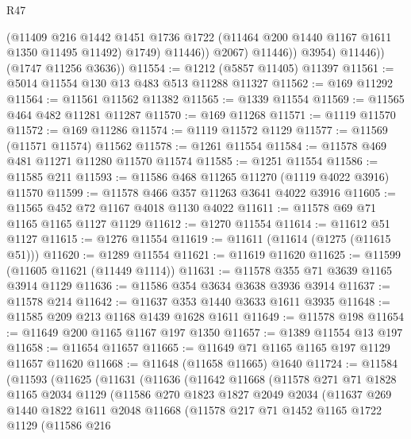 \begin{lexlean}{R47}
\begin{coremodule}
                      (@11409
                        @216
                        @1442
                        @1451
                        @1736
                        @1722
                        (@11464 @200 @1440 @1167 @1611 @1350 @11495 @11492)
                        @1749)
                      @11446))
                  @2067)
                @11446))
            @3954)
          @11446))
      (@1747 @11256 @3636))
@11554 := @1212 (@5857 @11405) @11397
@11561 := @5014 @11554 @130 @13 @483 @513 @11288 @11327
@11562 := @169 @11292
@11564 := @11561 @11562 @11382
@11565 := @1339 @11554
@11569 := @11565 @464 @482 @11281 @11287
@11570 := @169 @11268
@11571 := @1119 @11570
@11572 := @169 @11286
@11574 := @1119 @11572 @1129
@11577 := @11569 (@11571 @11574) @11562
@11578 := @1261 @11554
@11584 := @11578 @469 @481 @11271 @11280 @11570 @11574
@11585 := @1251 @11554
@11586 := @11585 @211
@11593 := @11586 @468 @11265 @11270 (@1119 @4022 @3916) @11570
@11599 := @11578 @466 @357 @11263 @3641 @4022 @3916
@11605 := @11565 @452 @72 @1167 @4018 @1130 @4022
@11611 := @11578 @69 @71 @1165 @1165 @1127 @1129
@11612 := @1270 @11554
@11614 := @11612 @51 @1127
@11615 := @1276 @11554
@11619 := @11611 (@11614 (@1275 (@11615 @51)))
@11620 := @1289 @11554
@11621 := @11619 @11620
@11625 := @11599 (@11605 @11621 (@11449 @1114))
@11631 := @11578 @355 @71 @3639 @1165 @3914 @1129
@11636 := @11586 @354 @3634 @3638 @3936 @3914
@11637 := @11578 @214
@11642 := @11637 @353 @1440 @3633 @1611 @3935
@11648 := @11585 @209 @213 @1168 @1439 @1628 @1611
@11649 := @11578 @198
@11654 := @11649 @200 @1165 @1167 @197 @1350
@11657 := @1389 @11554 @13 @197
@11658 := @11654 @11657
@11665 := @11649 @71 @1165 @1165 @197 @1129 @11657 @11620
@11668 := @11648 (@11658 @11665) @1640
@11724 := @11584
    (@11593
      (@11625
        (@11631
          (@11636
            (@11642
              @11668
              (@11578
                @271
                @71
                @1828
                @1165
                @2034
                @1129
                (@11586
                  @270
                  @1823
                  @1827
                  @2049
                  @2034
                  (@11637
                    @269
                    @1440
                    @1822
                    @1611
                    @2048
                    @11668
                    (@11578
                      @217
                      @71
                      @1452
                      @1165
                      @1722
                      @1129
                      (@11586
                        @216

\end{coremodule}
\end{lexlean}
